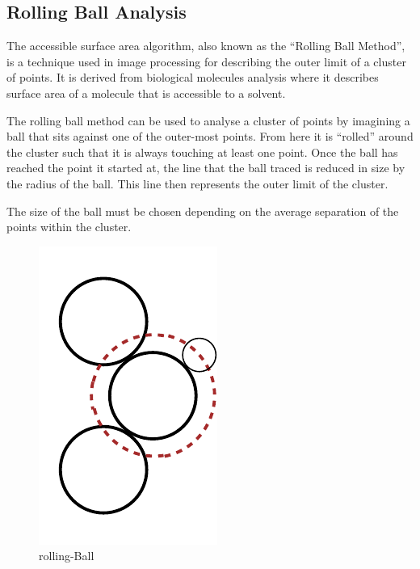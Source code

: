 
\subsection{Rolling Ball Analysis}
\label{sub:rolling_ball_analysis}

The accessible surface area algorithm, also known as the ``Rolling Ball
Method'', is a technique used in image processing for describing the outer
limit of a cluster of points. It is derived from biological molecules analysis
where it describes surface area of a molecule that is accessible to a solvent.

The rolling ball method can be used to analyse a cluster of points by imagining
a ball that sits against one of the outer-most points. From here it is
``rolled'' around the cluster such that it is always touching at least one
point. Once the ball has reached the point it started at, the line that the ball
traced is reduced in size by the radius of the ball. This line then represents
the outer limit of the cluster.

The size of the ball must be chosen depending on the average separation of the
points within the cluster.

\begin{figure}[htpb]
	\centering
	\includegraphics[width=0.5\linewidth]{rolling-ball.pdf}
	\caption{rolling-Ball}
	\label{fig:rolling-ball}
\end{figure}
